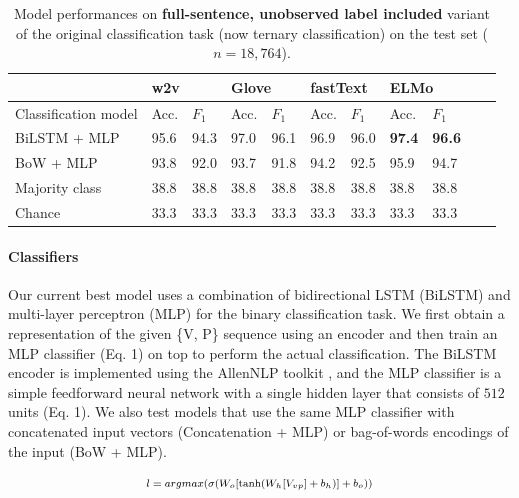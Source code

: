 \documentclass[letterpaper]{article} %
\begin{document}
\begin{table}[h]
	\centering
	\begin{tabular}{@{}lllllllllll@{}}
		\toprule
		& \multicolumn{2}{l}{w2v}  & \multicolumn{2}{l}{Glove} &  \multicolumn{2}{l}{fastText} & \multicolumn{2}{l}{ELMo}  \\ \midrule
		Classification model       & Acc. & $F_1$ & Acc. & $F_1$ & Acc. & $F_1$ & Acc. & $F_1$   \\ \midrule
		BiLSTM + MLP &  95.6  & 94.3 \hspace{1cm} & 97.0  & 96.1  \hspace{1cm} & 96.9 & 96.0  \hspace{1cm} & \textbf{97.4} & \textbf{96.6} \\
		BoW + MLP & 93.8 & 92.0& 93.7& 91.8& 94.2 & 92.5& 95.9 & 94.7 \\
		Majority class & 38.8 & 38.8 & 38.8 & 38.8 & 38.8 & 38.8 & 38.8 & 38.8 \\
		Chance       & 33.3  & 33.3  & 33.3 & 33.3 & 33.3 & 33.3 & 33.3  & 33.3  \\
		\bottomrule
	\end{tabular}
	\caption{Model performances on \textbf{full-sentence, unobserved label included} variant of the original classification task (now ternary classification) on the test set ($n=18,764$).}
	\label{ex1-2:full sentence task}
\end{table}



\paragraph{Classifiers}
Our current best model uses a combination of bidirectional LSTM (BiLSTM) and multi-layer perceptron (MLP) for the binary classification task. We first obtain a representation of the given \{\textsc{V, P}\} sequence using an encoder and then train an MLP classifier (Eq. 1) on top to perform the actual classification. The BiLSTM encoder is implemented using the AllenNLP toolkit \cite{gardner2018allennlp}, and the MLP classifier is a simple feedforward neural network with a single hidden layer that consists of $512$ units (Eq. 1). We also test models that use the same MLP classifier with concatenated input vectors (Concatenation + MLP) or bag-of-words encodings of the input (BoW + MLP).


\begin{equation}
\label{eq1}
\fontsize{7.5pt}{8.5pt}\selectfont
\begin{array}{ll}
l = argmax(\sigma(W_o [ \tanh(W_h[V_{vp}] + b_h)] + b_o))
\end{array}
\end{equation}
\end{document}
